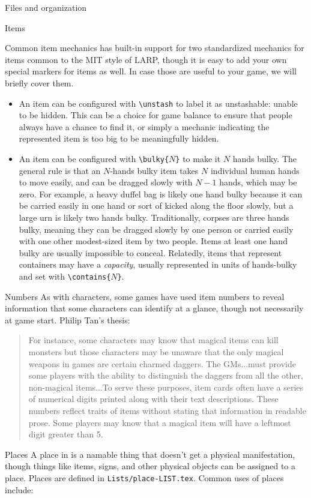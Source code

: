 \documentclass[sheet]{GameTexBase}
\begin{document}
\begin{section}{Files and organization}
\begin{subsection}{Items}
\begin{subsubsection}{Common item mechanics}
\gametex{} has built-in support for two standardized mechanics for items common to the MIT style of LARP, though it is easy to add your own special markers for items as well.  In case those are useful to your game, we will briefly cover them.
\begin{itemize}
\item An item can be configured with \lstinline|\unstash| to label it as unstashable: unable to be hidden.  This can be a choice for game balance to ensure that people always have a chance to find it, or simply a mechanic indicating the represented item is too big to be meaningfully hidden.
\item An item can be configured with \texttt{\textbackslash{}bulky\{$N$\}} to make it $N$ hands bulky.  The general rule is that an $N$-hands bulky item takes $N$ individual human hands to move easily, and can be dragged slowly with $N-1$ hands, which may be zero.  For example, a heavy duffel bag is likely one hand bulky because it can be carried easily in one hand or sort of kicked along the floor slowly, but a large urn is likely two hands bulky.  Traditionally, corpses are three hands bulky, meaning they can be dragged slowly by one person or carried easily with one other modest-sized item by two people.  Items at least one hand bulky are usually impossible to conceal.  Relatedly, items that represent containers may have a \emph{capacity}, usually represented in units of hands-bulky and set with \texttt{\textbackslash{}contains\{$N$\}}.
\end{itemize}
\end{subsubsection}
\begin{subsubsection}{Numbers}
As with characters, some games have used item numbers to reveal information that some characters can identify at a glance, though not necessarily at game start.  Philip Tan's thesis:
\begin{quote}
For instance, some characters may know that magical items can kill monsters but those
characters may be unaware that the only magical weapons in games are certain charmed
daggers. The GMs...must provide some players with the
ability to distinguish the daggers from all the other, non-magical items...To serve these purposes, item cards often have a series of numerical digits printed along
with their text descriptions. These numbers reflect traits of items without stating that
information in readable prose. Some players may know that a magical item will have a
leftmost digit greater than 5.
\end{quote}
\end{subsubsection}
\end{subsection}
\begin{subsection}{Places}
A place in \gametex{} is a namable thing that doesn't get a physical manifestation, though things like
items, signs, and other physical objects can be assigned to a place.  Places are defined in \lstinline|Lists/place-LIST.tex|.  Common uses of places include:


\end{subsection}
\end{section}
\end{document}
